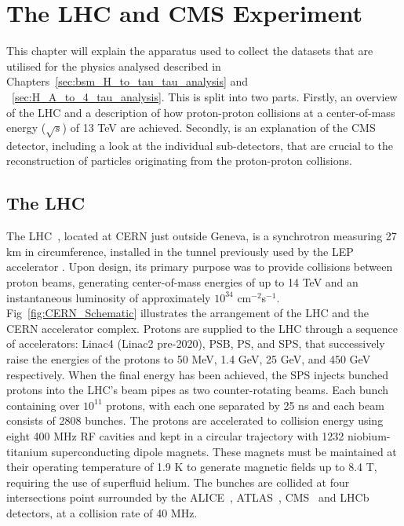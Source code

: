 \chapter{The LHC and CMS Experiment}
\label{sec:cms}

This chapter will explain the apparatus used to collect the datasets that are utilised for the physics analysed described in Chapters~\ref{sec:bsm_H_to_tau_tau_analysis} and ~\ref{sec:H_A_to_4_tau_analysis}.
This is split into two parts.
Firstly, an overview of the \ac{LHC} and a description of how proton-proton collisions at a center-of-mass energy ($\sqrt{s}$) of 13 TeV are achieved.
Secondly, is an explanation of the \ac{CMS} detector, including a look at the individual sub-detectors, that are crucial to the reconstruction of particles originating from the proton-proton collisions.

\section{The LHC}

The \ac{LHC}~\cite{Evans:2008zzb}, located at \ac{CERN} just outside Geneva, is a synchrotron measuring 27 km in circumference, installed in the tunnel previously used by the \ac{LEP} accelerator \cite{203828}. 
Upon design, its primary purpose was to provide collisions between proton beams, generating center-of-mass energies of up to 14 TeV and an instantaneous luminosity of approximately $10^{34}$ cm$^{−2}$s$^{−1}$. 
Fig~\ref{fig:CERN_Schematic} illustrates the arrangement of the LHC and the \ac{CERN} accelerator complex. 
Protons are supplied to the LHC through a sequence of accelerators: Linac4 (Linac2 pre-2020), \ac{PSB}, \ac{PS}, and \ac{SPS}, that successively raise the energies of the protons to 50 MeV, 1.4 GeV, 25 GeV, and 450 GeV respectively. 
When the final energy has been achieved, the \ac{SPS} injects bunched protons into the \ac{LHC}'s beam pipes as two counter-rotating beams. 
Each bunch containing over $10^11$ protons, with each one separated by 25 ns and each beam consists of 2808 bunches. 
The protons are accelerated to collision energy using eight 400 MHz \ac{RF} cavities and kept in a circular trajectory with 1232 niobium-titanium superconducting dipole magnets. 
These magnets must be maintained at their operating temperature of 1.9 K to generate magnetic fields up to 8.4 T, requiring the use of superfluid helium. 
The bunches are collided at four intersections point surrounded by the ALICE~\cite{ALICE:2008ngc}, ATLAS~\cite{ATLAS:2008xda}, CMS~\cite{CMS_Setup} and LHCb~\cite{LHCb:2008vvz} detectors, at a collision rate of 40 MHz. \\

